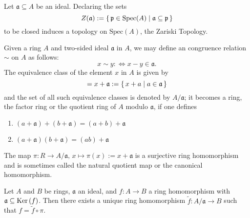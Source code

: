 \begin{defn}
    Let \(\mathfrak{a} \subseteq A\) be an ideal. Declaring the sets
    \begin{equation}
        Z(\mathfrak{a}) := \left\{\, \mathfrak{p} \in \mathrm{Spec}(A) \mathrel{\mid} \mathfrak{a} \subseteq \mathfrak{p} \,\right\}
    \end{equation}
    to be closed induces a topology on \(\mathrm{Spec}(A)\), the Zariski Topology.
\end{defn}

\begin{defn}
    Given a ring \(A\) and two-sided ideal \(\mathfrak{a}\) in \(A\), we may define an congruence relation \(\sim\) on \(A\) as follows:
    \begin{equation}
        x \sim y :\Longleftrightarrow x - y \in \mathfrak{a} \text{.}
    \end{equation}
    The equivalence class of the element \(x\) in \(A\) is given by
    \begin{equation}
        [x] = x + \mathfrak{a} := \makeset{x + a}{a \in \mathfrak{a}}
    \end{equation}
    and the set of all such equivalence classes is denoted by \(A / \mathfrak{a}\); it becomes a ring, the factor ring or the quotient ring of \(A\) modulo \(\mathfrak{a}\), if one defines
    \begin{enumerate}
        \item \((a + \mathfrak{a}) + (b + \mathfrak{a}) = (a + b) + \mathfrak{a}\)
        \item \((a + \mathfrak{a}) (b + \mathfrak{a}) = (ab) + \mathfrak{a}\)
    \end{enumerate}
    The map \(\pi: R \longrightarrow A / \mathfrak{a}, \, x \mapsto \pi(x) := x + \mathfrak{a}\) is a surjective ring homomorphism and is sometimes called the natural quotient map or the canonical homomorphism.
\end{defn}

\begin{prps}
    Let \(A\) and \(B\) be rings, \(\mathfrak{a}\) an ideal, and \(f: A \longrightarrow B\) a ring homomorphism with \(\mathfrak{a} \subseteq \mathrm{Ker} \left( f \right)\). Then there exists a unique ring homomorphism \(\tilde{f}: A / \mathfrak{a} \longrightarrow B\) such that \(f = \tilde{f} \circ \pi\).
\end{prps}

\begin{defn}
    
\end{defn}

